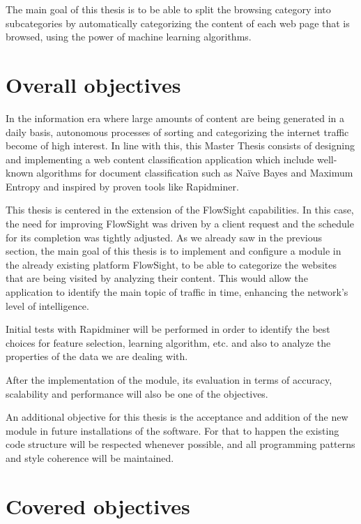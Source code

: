 \documentclass[12pt, a4paper , titlepage]{report}
\begin{document}

The main goal of this thesis is to be able to split the browsing category into subcategories by automatically categorizing the content of each web page that is browsed, using the power of machine learning
algorithms.


\chapter{Overall objectives}
In the information era where large amounts of content are being generated in a daily basis, autonomous processes of sorting and categorizing the internet traffic become of high interest.
In line with this, this Master Thesis consists of designing and implementing a web content classification application which include well-known algorithms for document classification such as Naïve 
Bayes and Maximum Entropy and inspired by proven tools like Rapidminer. 

This thesis is centered in the extension of the FlowSight capabilities. In this case, the need for improving FlowSight was driven by a client request and the schedule for its completion was tightly
adjusted. As we already saw in the previous section, the main goal of this thesis is to implement and configure a module in the already existing platform FlowSight, to be able to categorize the
websites that are being visited by analyzing their content.
This would allow the application to identify the main topic of traffic in time, enhancing the network's level of intelligence.
 
Initial tests with Rapidminer will be performed in order to identify the best choices for feature selection, learning algorithm, etc. and also to analyze the properties of the data we are dealing with.

After the implementation of the module, its evaluation in terms of accuracy, scalability and performance will also be one of the objectives.

An additional objective for this thesis is the acceptance and addition of the new module in future installations of the software. For that to happen the existing code structure will be respected
whenever possible, and all programming patterns and style coherence will be maintained.

\chapter{Covered objectives}
\end{document}
